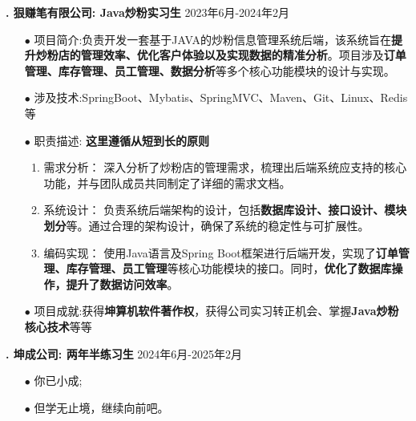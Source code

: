 \documentclass[10pt]{article}
\begin{document}
    \vspace{1em}
    \textbf{\uppercase\expandafter{}. 狠赚笔有限公司: Java炒粉实习生
    }  \hfill 2023年6月-2024年2月
    \vspace{0.4em}
    \begin{itemize}[itemsep=1pt, leftmargin=2em]
        \item[\Large $\bullet$] \small 项目简介:负责开发一套基于JAVA的炒粉信息管理系统后端，该系统旨在\textbf{提升炒粉店的管理效率、优化客户体验以及实现数据的精准分析}。项目涉及\textbf{订单管理、库存管理、员工管理、数据分析}等多个核心功能模块的设计与实现。
        \item[\Large $\bullet$] \small 涉及技术:SpringBoot、Mybatis、SpringMVC、Maven、Git、Linux、Redis等
        \item[\Large $\bullet$] \small 职责描述: \textbf{这里遵循从短到长的原则}
        \begin{enumerate}
            \item 需求分析： 深入分析了炒粉店的管理需求，梳理出后端系统应支持的核心功能，并与团队成员共同制定了详细的需求文档。
            \item 系统设计： 负责系统后端架构的设计，包括\textbf{数据库设计、接口设计、模块划分}等。通过合理的架构设计，确保了系统的稳定性与可扩展性。
            \item 编码实现： 使用Java语言及Spring Boot框架进行后端开发，实现了\textbf{订单管理、库存管理、员工管理}等核心功能模块的接口。同时，\textbf{优化了数据库操作，提升了数据访问效率}。
        \end{enumerate}
        \item[\Large $\bullet$] \small 项目成就:获得\textbf{坤算机软件著作权}，获得公司实习转正机会、掌握\textbf{Java炒粉核心技术}等等
        
    \end{itemize}

    \vspace{1em}

    \textbf{\uppercase\expandafter{}. 坤成公司: 两年半练习生
    }  \hfill 2024年6月-2025年2月
    \vspace{0.4em}
    \begin{itemize}[itemsep=1pt, leftmargin=2em]
        \item[\Large $\bullet$] \small 你已小成;
        \item[\Large $\bullet$] \small 但学无止境，继续向前吧。
    \end{itemize}
\end{document}
